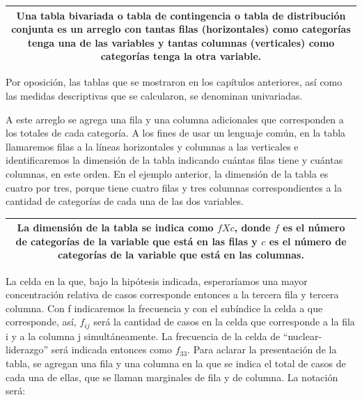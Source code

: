 \documentclass[]{book}
\begin{document}
\begin{longtable}[]{@{}c@{}}
\toprule
\endhead
\begin{minipage}[t]{0.97\columnwidth}\centering
Una \textbf{tabla bivariada} o \textbf{tabla de contingencia} o \textbf{tabla de distribución conjunta} es un arreglo con tantas filas (horizontales) como categorías tenga una de las variables y tantas columnas (verticales) como categorías tenga la otra variable.\strut
\end{minipage}\tabularnewline
\bottomrule
\end{longtable}

Por oposición, las tablas que se mostraron en los capítulos anteriores, así como las medidas descriptivas que se calcularon, se denominan univariadas.

A este arreglo se agrega una fila y una columna adicionales que
corresponden a los totales de cada categoría. A los fines de usar un
lenguaje común, en la tabla llamaremos filas a la líneas horizontales y columnas a las verticales e identificaremos la dimensión de la
tabla indicando cuántas filas tiene y cuántas columnas, en este orden. En el ejemplo anterior, la dimensión de la tabla es cuatro por tres, porque tiene cuatro filas y tres columnas correspondientes a la cantidad
de categorías de cada una de las dos variables.

\begin{longtable}[]{@{}c@{}}
\toprule
\endhead
\begin{minipage}[t]{0.97\columnwidth}\centering
La \textbf{dimensión} de la tabla se indica como \(f X c\), donde \(f\) es el número de categorías de la variable que está en las filas y \(c\) es el número de categorías de la variable que está en las columnas.\strut
\end{minipage}\tabularnewline
\bottomrule
\end{longtable}

La celda en la que, bajo la hipótesis indicada, esperaríamos una mayor concentración relativa de casos corresponde entonces a la tercera fila y tercera columna. Con f indicaremos la frecuencia y con el subíndice la celda a que corresponde, así, \(f_{ij}\) será la cantidad de casos en la celda que corresponde a la fila i y a la columna j simultáneamente. La frecuencia de la celda de ``nuclear-liderazgo'' será indicada entonces como \(f_{33}\). Para aclarar la presentación de la tabla, se agregan una fila y una columna en la que se indica el total de casos de cada una de ellas, que se llaman marginales de fila y de columna. La notación será:
\end{document}
